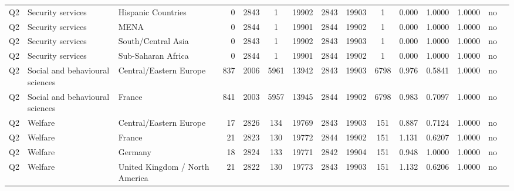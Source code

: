 \begin{longtable}{lllrcccccccccll}
Q2 & Security services & Hispanic Countries & 0 & 2843 & 1 & 19902 & 2843 & 19903 & 1 & 0.000 & 1.0000 & 1.0000 & no \\
Q2 & Security services & MENA & 0 & 2844 & 1 & 19901 & 2844 & 19902 & 1 & 0.000 & 1.0000 & 1.0000 & no \\
Q2 & Security services & South/Central Asia & 0 & 2843 & 1 & 19902 & 2843 & 19903 & 1 & 0.000 & 1.0000 & 1.0000 & no \\
Q2 & Security services & Sub-Saharan Africa & 0 & 2844 & 1 & 19901 & 2844 & 19902 & 1 & 0.000 & 1.0000 & 1.0000 & no \\
Q2 & Social and behavioural sciences & Central/Eastern Europe & 837 & 2006 & 5961 & 13942 & 2843 & 19903 & 6798 & 0.976 & 0.5841 & 1.0000 & no \\
Q2 & Social and behavioural sciences & France & 841 & 2003 & 5957 & 13945 & 2844 & 19902 & 6798 & 0.983 & 0.7097 & 1.0000 & no \\
Q2 & Welfare & Central/Eastern Europe & 17 & 2826 & 134 & 19769 & 2843 & 19903 & 151 & 0.887 & 0.7124 & 1.0000 & no \\
Q2 & Welfare & France & 21 & 2823 & 130 & 19772 & 2844 & 19902 & 151 & 1.131 & 0.6207 & 1.0000 & no \\
Q2 & Welfare & Germany & 18 & 2824 & 133 & 19771 & 2842 & 19904 & 151 & 0.948 & 1.0000 & 1.0000 & no \\
Q2 & Welfare & United Kingdom / North America & 21 & 2822 & 130 & 19773 & 2843 & 19903 & 151 & 1.132 & 0.6206 & 1.0000 & no \\
\end{longtable}
